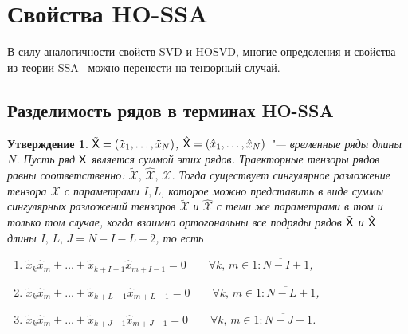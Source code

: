 \documentclass[specialist,
    substylefile = spbu_report.rtx,
    subf,href,colorlinks=true, 12pt]{disser}
\theoremstyle{plain}
\newtheorem{statement}{Утверждение}[section]
\theoremstyle{definition}
\theoremstyle{remark}
\begin{document}
    \section{Свойства HO-SSA}\label{sec:HO-SSA-properties}
    В силу аналогичности свойств SVD и HOSVD, многие определения и свойства из теории SSA~\cite{ssa} можно перенести на тензорный случай.

    \subsection{Разделимость рядов в терминах HO-SSA}\label{subsec:tensor-ssa-separability}
    \begin{statement}
        \label{state:separability}
        $\tilde{\mathsf{X}}=(\tilde{x}_1,\ldots , \tilde{x}_N)$, $\hat{\mathsf{X}}=(\hat{x}_1,\ldots , \hat{x}_N)$ "--- временные ряды длины $N$.
        Пусть ряд $\mathsf{X}$ является суммой этих рядов.
        Траекторные тензоры рядов равны соответственно: $\tilde{\mathcal{X}},\, \hat{\mathcal{X}},\, \mathcal{X}$.
        Тогда существует сингулярное разложение тензора $\mathcal{X}$ с параметрами $I, L$, которое можно представить
        в виде суммы сингулярных разложений тензоров $\tilde{\mathcal{X}}$ и $\hat{\mathcal{X}}$ с теми же параметрами
        в том и только том случае, когда взаимно ортогональны все подряды рядов $\tilde{\mathsf{X}}$ и $\hat{\mathsf{X}}$
        длины $I,\, L,\, J=N-I-L+2$, то есть
        \begin{enumerate}
            \item $\tilde{x}_{k}\hat{x}_m + \ldots + \tilde{x}_{k+I-1} \hat{x}_{m+I-1}=0 \qquad \forall k,\, m\in\overline{1:N-I+1}$,
            \item $\tilde{x}_{k}\hat{x}_m + \ldots + \tilde{x}_{k+L-1} \hat{x}_{m+L-1}=0 \qquad \forall k,\, m\in\overline{1:N-L+1}$,
            \item $\tilde{x}_{k}\hat{x}_m + \ldots + \tilde{x}_{k+J-1} \hat{x}_{m+J-1}=0 \qquad \forall k,\, m\in\overline{1:N-J+1}$.
        \end{enumerate}
    \end{statement}
\end{document}
